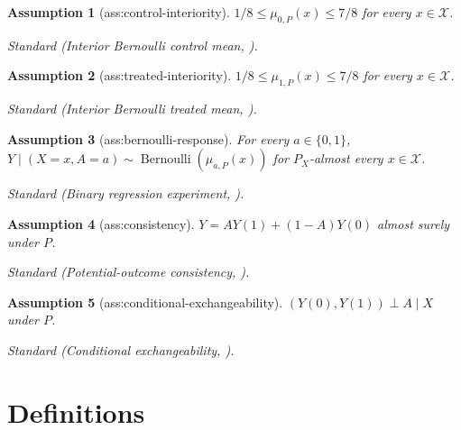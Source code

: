 \documentclass{article}
\newtheorem{assumption}{Assumption}
\begin{document}
\begin{assumption}[ass:control-interiority]\label{ass:control-interiority}
\(1/8\le\mu_{0,P}(x)\le7/8\) for every \(x\in\mathcal X\).
\par\smallskip\noindent\emph{Standard} (Interior Bernoulli control mean, \cite{KennedyBalakrishnanRobinsWasserman2024MinimaxCATE}).
\end{assumption}

\begin{assumption}[ass:treated-interiority]\label{ass:treated-interiority}
\(1/8\le\mu_{1,P}(x)\le7/8\) for every \(x\in\mathcal X\).
\par\smallskip\noindent\emph{Standard} (Interior Bernoulli treated mean, \cite{KennedyBalakrishnanRobinsWasserman2024MinimaxCATE}).
\end{assumption}

\begin{assumption}[ass:bernoulli-response]\label{ass:bernoulli-response}
For every \(a\in\{0,1\}\), \(Y\mid(X=x,A=a)\sim\operatorname{Bernoulli}(\mu_{a,P}(x))\) for \(P_X\)-almost every \(x\in\mathcal X\).
\par\smallskip\noindent\emph{Standard} (Binary regression experiment, \cite{KennedyBalakrishnanRobinsWasserman2024MinimaxCATE}).
\end{assumption}

\begin{assumption}[ass:consistency]\label{ass:consistency}
\(Y=A Y(1)+(1-A)Y(0)\) almost surely under \(P\).
\par\smallskip\noindent\emph{Standard} (Potential-outcome consistency, \cite{KennedyBalakrishnanRobinsWasserman2024MinimaxCATE}).
\end{assumption}

\begin{assumption}[ass:conditional-exchangeability]\label{ass:conditional-exchangeability}
\((Y(0),Y(1))\perp A\mid X\) under \(P\).
\par\smallskip\noindent\emph{Standard} (Conditional exchangeability, \cite{KennedyBalakrishnanRobinsWasserman2024MinimaxCATE}).
\end{assumption}

\section{Definitions}
\end{document}
